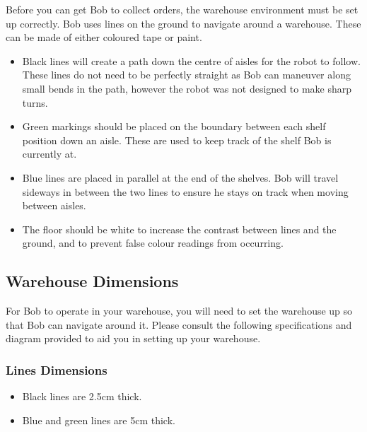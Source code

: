 \documentclass[onecolumn]{IEEEtran}
\begin{document}
\begin{minipage}{0.65\textwidth}
Before you can get Bob to collect orders, the warehouse environment must be set up correctly. 
Bob uses lines on the ground to navigate around a warehouse. These can be made of either coloured tape or paint.
\begin{itemize}
    \item Black lines will create a path down the centre of aisles for the robot to follow. These lines do not need to be perfectly straight as Bob can maneuver along small bends in the path, however the robot was not designed to make sharp turns.  
    \item Green markings should be placed on the boundary between each shelf position down an aisle. These are used to keep track of the shelf Bob is currently at.
    \item Blue lines are placed in parallel at the end of the shelves. Bob will travel sideways in between the two lines to ensure he stays on track when moving between aisles.
    \item The floor should be white to increase the contrast between lines and the ground, and to prevent false colour readings from occurring. 
\end{itemize}

\end{minipage}

\subsection{Warehouse Dimensions}
For Bob to operate in your warehouse, you will need to set the warehouse up so that Bob can navigate around it. Please consult the following specifications and diagram provided to aid you in setting up your warehouse.

\subsubsection{Lines Dimensions}
\begin{itemize}
    \item Black lines are 2.5cm thick.
    \item Blue and green lines are 5cm thick.
\end{itemize}
\end{document}
